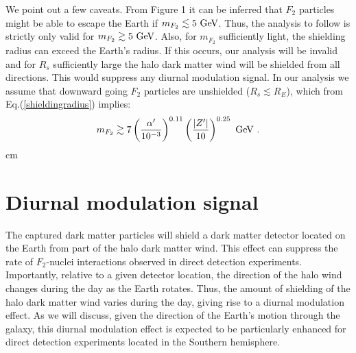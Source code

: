 \documentclass[12pt]{article}
\begin{document}
We point out a few caveats. From Figure 1 it can be inferred that $F_2$ particles might be able to escape the Earth if $m _{F_2} \lesssim 5 \ \rm GeV$. Thus, the analysis to follow is strictly only valid for $m _{F_2} \gtrsim 5 \ {\rm GeV}$. Also, for $m _{F_2}$ sufficiently light, the shielding radius can exceed the Earth's radius. If this occurs, our analysis will be invalid and for $R_s$ sufficiently large the halo dark matter wind will be shielded from all directions. This would suppress any diurnal modulation signal. In our analysis we assume that downward going $F_2$ particles are unshielded ($R _s \lesssim R _E$), which from Eq.(\ref{shieldingradius}) implies:
%
\begin{eqnarray}
m _{F_2} \gtrsim 7 \left ( \frac{\alpha '}{10 ^{-3}} \right ) ^{0.11}\left ( \frac{|Z'|}{10} \right ) ^{0.25} \ \rm GeV \ .
\end{eqnarray}
%
 cm

\section{Diurnal modulation signal}

The captured dark matter particles will shield a dark matter detector located on the Earth from part of the halo dark matter wind. This effect can suppress the rate of $F_2$-nuclei interactions observed in direct detection experiments. Importantly, relative to a given detector location, the direction of the halo wind changes during the day as the Earth rotates. Thus, the amount of shielding of the halo dark matter wind varies during the day, giving rise to a diurnal modulation effect. As we will discuss, given the direction of the Earth's motion through the galaxy, this diurnal modulation effect is expected to be particularly enhanced for direct detection experiments located in the Southern hemisphere.
\end{document}
